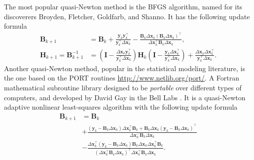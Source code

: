 The most popular quasi-Newton method is the BFGS algorithm, named for
its discoverers Broyden, Fletcher, Goldfarb, and Shanno. It has the
following update formula
\begin{align*}
  \mathbf{B}_{k+1} &= \mathbf{B}_{k} +
                     \frac{\mathbf{y}_{k}\mathbf{y}_{k}^{\top}}{
                     \mathbf{y}_{k}^{\top}\Delta\mathbf{x}_{k}} -
                     \frac{\mathbf{B}_{k}\Delta\mathbf{x}_{k}
                     (\mathbf{B}_{k}\Delta\mathbf{x}_{k})^{\top}}{
                     \Delta\mathbf{x}_{k}^{\top}\mathbf{B}_{k}
                     \Delta\mathbf{x}_{k}},\\
  \mathbf{H}_{k+1} = \mathbf{B}_{k+1}^{-1}
                   &= \left(
                     \mathbf{I} -
                     \frac{\Delta\mathbf{x}_{k}\mathbf{y}_{k}^{\top}}{
                     \mathbf{y}_{k}^{\top}\Delta\mathbf{x}_{k}}
                     \right) \mathbf{H}_{k}
                     \left(
                     \mathbf{I} -
                     \frac{\mathbf{y}_{k}\Delta\mathbf{x}_{k}^{\top}}{
                     \mathbf{y}_{k}^{\top}\Delta\mathbf{x}_{k}}
                     \right) +
                     \frac{\Delta\mathbf{x}_{k}
                     \Delta\mathbf{x}_{k}^{\top}}{
                     \mathbf{y}_{k}^{\top}\Delta\mathbf{x}_{k}}.
\end{align*}
Another quasi-Newton method, popular in the statistical modeling
literature, is the one based on the PORT routines
\url{http://www.netlib.org/port/}. A Fortran mathematical subroutine
library designed to be \textit{portable} over different types of
computers, and developed by David Gay in the Bell Labs
\cite{PORTreport}. It is a quasi-Newton adaptive nonlinear least-squares
algorithm \cite{PORTpaper} with the following update formula
\begin{align*}
  \mathbf{B}_{k+1} &= \mathbf{B}_{k}\\
                   &+ \frac{
                     \left(\mathbf{y}_{k} -
                     \mathbf{B}_{k}\Delta\mathbf{x}_{k}\right)
                     \Delta\mathbf{x}_{k}^{\top}\mathbf{B}_{k} +
                     \mathbf{B}_{k}\Delta\mathbf{x}_{k}
                     \left(\mathbf{y}_{k} -
                     \mathbf{B}_{k}\Delta\mathbf{x}_{k}\right)^{\top}}{
                     \Delta\mathbf{x}_{k}^{\top}\mathbf{B}_{k}
                     \Delta\mathbf{x}_{k}}\\
                   &- \frac{\Delta\mathbf{x}_{k}^{\top}
                     \left(\mathbf{y}_{k} -
                     \mathbf{B}_{k}\Delta\mathbf{x}_{k}\right)
                     \mathbf{B}_{k}\Delta\mathbf{x}_{k}
                     \Delta\mathbf{x}_{k}^{\top}\mathbf{B}_{k}}{
                     \left(\Delta\mathbf{x}_{k}^{\top}\mathbf{B}_{k}
                     \Delta\mathbf{x}_{k}\right)^{\top}
                     \Delta\mathbf{x}_{k}^{\top}\mathbf{B}_{k}
                     \Delta\mathbf{x}_{k}}.
\end{align*}
